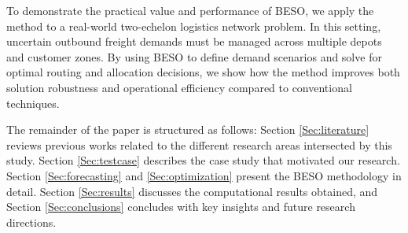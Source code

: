\documentclass[opre,sglanonrev,11pt]{informs4}
\begin{document}
To demonstrate the practical value and performance of BESO, we apply the method to a real-world two-echelon logistics network problem. In this setting, uncertain outbound freight demands must be managed across multiple depots and customer zones. By using BESO to define demand scenarios and solve for optimal routing and allocation decisions, we show how the method improves both solution robustness and operational efficiency compared to conventional techniques.

The remainder of the paper is structured as follows: Section \ref{Sec:literature} reviews previous works related to the different research areas intersected by this study. Section \ref{Sec:testcase} describes the case study that motivated our research. Section \ref{Sec:forecasting} and \ref{Sec:optimization} present the BESO methodology in detail.  Section \ref{Sec:results} discusses the computational results obtained, and Section \ref{Sec:conclusions} concludes with key insights and future research directions.



\end{document}
